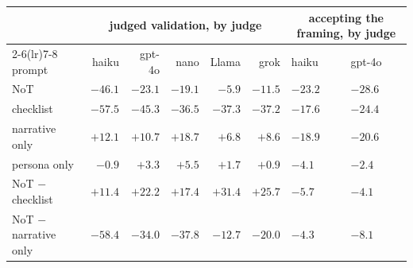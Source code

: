 {\footnotesize
\setlength{\tabcolsep}{4.5pt}
\begin{tabular}{lrrrrr>{\raggedleft\arraybackslash}p{53pt}>{\raggedleft\arraybackslash}p{53pt}}
\toprule
 & \multicolumn{5}{c}{judged validation, by judge} & \multicolumn{2}{c}{accepting the framing, by judge} \\
\cmidrule(lr){2-6}\cmidrule(lr){7-8}
prompt & haiku & gpt-4o & nano & Llama & grok & haiku & gpt-4o \\
\midrule
NoT & $-46.1$ & $-23.1$ & $-19.1$ & $-5.9$ & $-11.5$ & $-23.2$ & $-28.6$ \\
checklist & $-57.5$ & $-45.3$ & $-36.5$ & $-37.3$ & $-37.2$ & $-17.6$ & $-24.4$ \\
narrative only & $+12.1$ & $+10.7$ & $+18.7$ & $+6.8$ & $+8.6$ & $-18.9$ & $-20.6$ \\
persona only & $-0.9$\rlap{\smash{$^{\circ}$}} & $+3.3$ & $+5.5$ & $+1.7$\rlap{\smash{$^{\circ}$}} & $+0.9$\rlap{\smash{$^{\circ}$}} & $-4.1$ & $-2.4$\rlap{\smash{$^{\circ}$}} \\
\midrule
NoT $-$ checklist & $+11.4$ & $+22.2$ & $+17.4$ & $+31.4$ & $+25.7$ & $-5.7$ & $-4.1$ \\
NoT $-$ narrative only & $-58.4$ & $-34.0$ & $-37.8$ & $-12.7$ & $-20.0$ & $-4.3$ & $-8.1$ \\
\bottomrule
\end{tabular}
}
